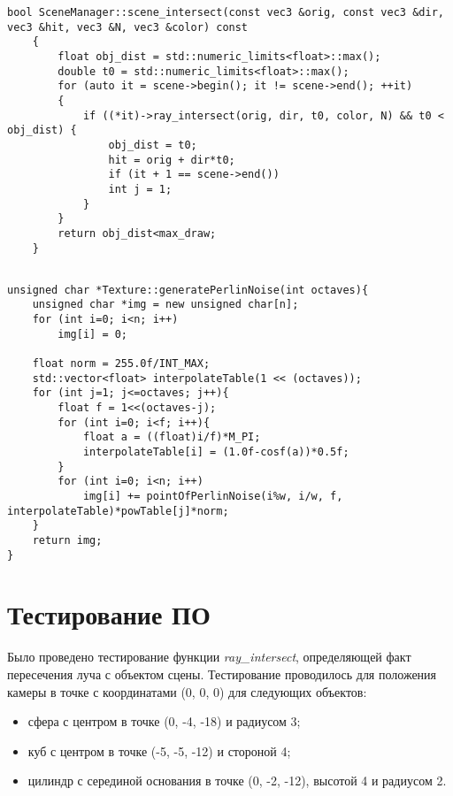 
\clearpage

\begin{lstlisting}[caption=Функция создания ячеистой структуры]
	bool SceneManager::scene_intersect(const vec3 &orig, const vec3 &dir, vec3 &hit, vec3 &N, vec3 &color) const
	{
		float obj_dist = std::numeric_limits<float>::max();
		double t0 = std::numeric_limits<float>::max();
		for (auto it = scene->begin(); it != scene->end(); ++it)
		{
			if ((*it)->ray_intersect(orig, dir, t0, color, N) && t0 < obj_dist) {
				obj_dist = t0;
				hit = orig + dir*t0;
				if (it + 1 == scene->end())
				int j = 1;
			}
		}
		return obj_dist<max_draw;
	}
	
\end{lstlisting}

\begin{lstlisting}[caption=Функция генерации шума Перлина]
unsigned char *Texture::generatePerlinNoise(int octaves){
	unsigned char *img = new unsigned char[n];
	for (int i=0; i<n; i++)
		img[i] = 0;
	
	float norm = 255.0f/INT_MAX;
	std::vector<float> interpolateTable(1 << (octaves));
	for (int j=1; j<=octaves; j++){
		float f = 1<<(octaves-j);
		for (int i=0; i<f; i++){
			float a = ((float)i/f)*M_PI;
			interpolateTable[i] = (1.0f-cosf(a))*0.5f;
		}
		for (int i=0; i<n; i++)
			img[i] += pointOfPerlinNoise(i%w, i/w, f, interpolateTable)*powTable[j]*norm;
	}
	return img;
}
\end{lstlisting}

\section{Тестирование ПО}
Было проведено тестирование функции \textit{ray\_intersect}, определяющей факт пересечения луча с объектом сцены. Тестирование проводилось для положения камеры в точке с координатами (0, 0, 0) для следующих объектов:
\begin{itemize}
	\item сфера с центром в точке (0, -4, -18) и радиусом 3;
	\item куб с центром в точке (-5, -5, -12) и стороной 4;
	\item цилиндр с серединой основания в точке (0, -2, -12), высотой 4 и радиусом 2.
\end{itemize}

